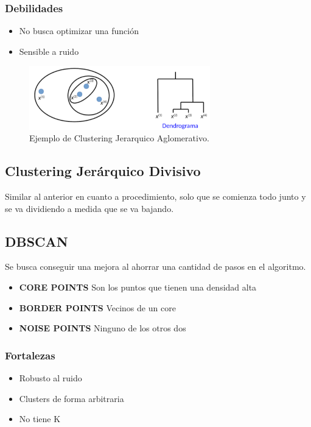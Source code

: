 \documentclass[titlepage,a4paper]{article}
\begin{document}
\subsubsection*{Debilidades}
\begin{itemize}
    \item No busca optimizar una función
    \item Sensible a ruido
\end{itemize}

\begin{figure}[!htb]
    \centering
    \includegraphics[width=0.7\textwidth]{imagenesResumen/ClusteringJerarquicoAglomerativo.PNG}
    \caption{Ejemplo de Clustering Jerarquico Aglomerativo.}
\end{figure}

\subsection{Clustering Jerárquico Divisivo}
Similar al anterior en cuanto a procedimiento, solo que se comienza todo junto y se va dividiendo a medida que se va bajando.

\subsection{DBSCAN}
Se busca conseguir una mejora al ahorrar una cantidad de pasos en el algoritmo.

\begin{itemize}
    \item \textbf{CORE POINTS} Son los puntos que tienen una densidad alta
    \item \textbf{BORDER POINTS} Vecinos de un core
    \item \textbf{NOISE POINTS} Ninguno de los otros dos
\end{itemize}

\subsubsection*{Fortalezas}
\begin{itemize}
    \item Robusto al ruido
    \item Clusters de forma arbitraria
    \item No tiene K
\end{itemize}
\end{document}
